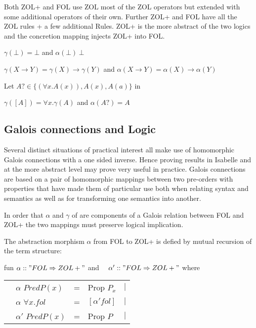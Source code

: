 Both ZOL+ and FOL use ZOL most of the ZOL operators but extended with some additional operators of their own. Further ZOL+ and FOL  have all the ZOL rules + a few additional Rules. ZOL+ is the more abstract of the two logics and the concretion mapping injects ZOL+ into FOL.

$\gamma(\bot) = \bot$ and $\alpha(\bot)\ \bot$ 

$\gamma(X\rightarrow Y) = \gamma(X) \rightarrow \gamma(Y)$ and 
$\alpha(X\rightarrow Y) = \alpha(X) \rightarrow \alpha(Y)$


Let $A? \in \{(\forall x .A(x)), A(x), A(a)\}$ in

$\gamma ([A]) = \forall x. \gamma(A)$ and $\alpha(A?) = A$

\subsection{Galois connections and Logic}
Several distinct situations of practical interest all make use of homomorphic Galois connections with a one sided inverse. Hence proving results in Isabelle and at the more abstract level may prove very useful in practice. 
Galois connections are based on a pair of homomorphic mappings between  two pre-orders with properties that have made them of particular use both when relating syntax and semantics as well as for transforming one semantics into another. 


In order that $\alpha$ and $\gamma$ of \sref{} are components of a Galois relation between FOL and ZOL+ the two mappings must preserve logical implication. 

The abstraction morphism $\alpha$ from FOL to ZOL+ is defied by mutual recursion of the term structure:

\begin{center}
\begin{minipage}{3in}
fun $\alpha :: "FOL \Rightarrow ZOL+"$  and \newline
\hspace{5mm}  $\quad\alpha' :: "FOL \Rightarrow ZOL+"$ where \\
\hspace{10mm}\begin{tabular}{lclc}
$\quad\alpha$ $ Pred P(x)$ & = & Prop \; $P_x$ &  $|$ \\ 
$\quad\alpha$ $ \forall x. fol $ & =  & $[ \alpha' fol]$ &  $|$ \\ 
$\quad\alpha'$ $ Pred P(x)$ & =  & Prop  $P$ &  $|$ \\ 
\end{tabular} 


\end{minipage}
  \end{center}  






